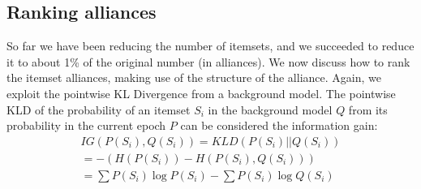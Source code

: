 \documentclass{sig-alternate}
\begin{document}

 
\subsection{Ranking alliances}
\label{sec:allianceRank}
So far we have been reducing the number of itemsets, and we succeeded to reduce it to about 1\% of the original number (in alliances). We now discuss how to rank the itemset alliances, making use of the structure of the alliance. 
Again, we exploit the pointwise KL Divergence from a background model. The pointwise KLD of the probability of an itemset $S_i$ in the background model $Q$ from its probability in the current epoch $P$ can be considered the information gain: 
\begin{multline}IG(P(S_i),Q(S_i)) = KLD(P(S_i)||Q(S_i)) \\ = - (H(P(S_i)) - H(P(S_i),Q(S_i))) \\ = \sum{P(S_i) \log{P(S_i)}} - \sum{P(S_i) \log{Q(S_i)}} \end{multline}
\end{document}
